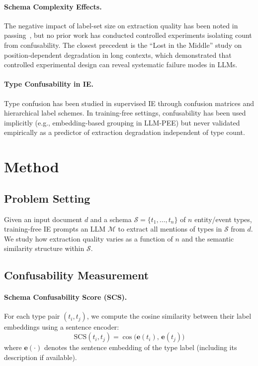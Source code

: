 \documentclass[11pt,a4paper]{article}
\begin{document}
\paragraph{Schema Complexity Effects.}
The negative impact of label-set size on extraction quality has been noted in passing~\cite{}, but no prior work has conducted controlled experiments isolating count from confusability.
The closest precedent is the ``Lost in the Middle'' study on position-dependent degradation in long contexts, which demonstrated that controlled experimental design can reveal systematic failure modes in LLMs.

\paragraph{Type Confusability in IE.}
Type confusion has been studied in supervised IE through confusion matrices and hierarchical label schemes.
In training-free settings, confusability has been used implicitly (e.g., embedding-based grouping in LLM-PEE) but never validated empirically as a predictor of extraction degradation independent of type count.

\section{Method}
\label{sec:method}

\subsection{Problem Setting}
Given an input document $d$ and a schema $\mathcal{S} = \{t_1, \ldots, t_n\}$ of $n$ entity/event types, training-free IE prompts an LLM $\mathcal{M}$ to extract all mentions of types in $\mathcal{S}$ from $d$.
We study how extraction quality varies as a function of $n$ and the semantic similarity structure within $\mathcal{S}$.

\subsection{Confusability Measurement}
\label{sec:scs}

\paragraph{Schema Confusability Score (SCS).}
For each type pair $(t_i, t_j)$, we compute the cosine similarity between their label embeddings using a sentence encoder:
\begin{equation}
    \text{SCS}(t_i, t_j) = \cos\bigl(\mathbf{e}(t_i),\, \mathbf{e}(t_j)\bigr)
\end{equation}
where $\mathbf{e}(\cdot)$ denotes the sentence embedding of the type label (including its description if available).
\end{document}
